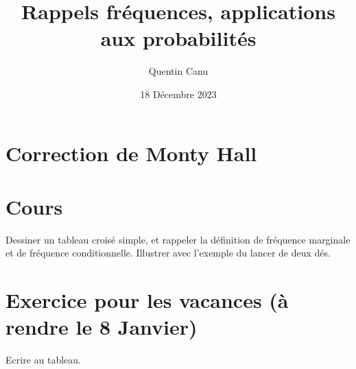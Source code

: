 \documentclass{article}
\title{Rappels fréquences, applications aux probabilités}
\author{Quentin Canu}
\date{18 Décembre 2023}
\begin{document}
\maketitle

\section{Correction de Monty Hall}
\section{Cours}
Dessiner un tableau croisé simple, et rappeler la définition de fréquence marginale et de fréquence conditionnelle. Illustrer avec l'exemple du lancer de deux dés.
\section{Exercice pour les vacances (à rendre le 8 Janvier)}
Ecrire au tableau.
\end{document}
